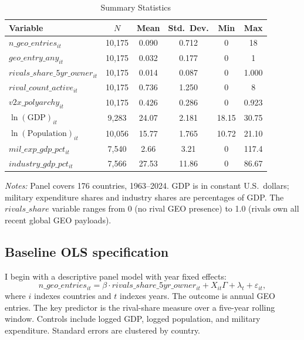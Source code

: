 \documentclass[11pt]{article}
\begin{document}
\begin{table}[htbp]
\centering
\caption{Summary Statistics}
\label{tab:summary}
\small
\begin{tabular}{lccccc}
\hline
Variable & $N$ & Mean & Std.\ Dev. & Min & Max \\
\hline
$n\_geo\_entries_{it}$                & 10{,}175 & 0.090 & 0.712 & 0 & 18 \\
$geo\_entry\_any_{it}$               & 10{,}175 & 0.032 & 0.177 & 0 & 1 \\
$rivals\_share\_5yr\_owner_{it}$      & 10{,}175 & 0.014 & 0.087 & 0 & 1.000 \\
$rival\_count\_active_{it}$          & 10{,}175 & 0.736 & 1.250 & 0 & 8 \\
$v2x\_polyarchy_{it}$               & 10{,}175 & 0.426 & 0.286 & 0 & 0.923 \\
$\ln(\text{GDP})_{it}$              & 9{,}283  & 24.07 & 2.181 & 18.15 & 30.75 \\
$\ln(\text{Population})_{it}$       & 10{,}056 & 15.77 & 1.765 & 10.72 & 21.10 \\
$mil\_exp\_gdp\_pct_{it}$            & 7{,}540  & 2.66  & 3.21  & 0 & 117.4 \\
$industry\_gdp\_pct_{it}$           & 7{,}566  & 27.53 & 11.86 & 0 & 86.67 \\
\hline
\end{tabular}
\vspace{4pt}

\footnotesize\textit{Notes:} Panel covers 176 countries, 1963--2024. GDP is in constant U.S.\ dollars; military expenditure shares and industry shares are percentages of GDP. The $rivals\_share$ variable ranges from 0 (no rival GEO presence) to 1.0 (rivals own all recent global GEO payloads).
\end{table}

\subsection{Baseline OLS specification}
I begin with a descriptive panel model with year fixed effects:
\begin{equation}
 n\_geo\_entries_{it} = \beta \cdot rivals\_share\_5yr\_owner_{it} + X_{it}\Gamma + \lambda_t + \varepsilon_{it},
\end{equation}
where $i$ indexes countries and $t$ indexes years. The outcome is annual GEO entries. The key predictor is the rival-share measure over a five-year rolling window. Controls include logged GDP, logged population, and military expenditure. Standard errors are clustered by country.
\end{document}
